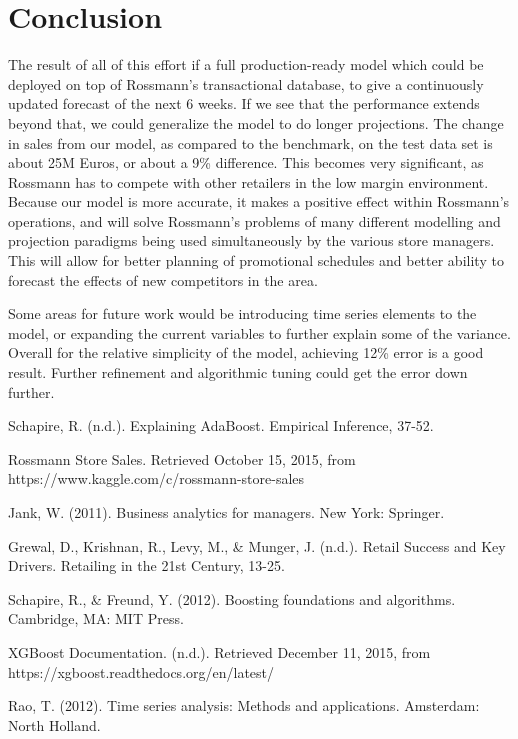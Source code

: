\documentclass[DIV=calc, paper=a4, fontsize=11pt]{scrartcl}	 %
\begin{document}

\section*{Conclusion}

The result of all of this effort if a full production-ready model which could be deployed on top of Rossmann's transactional database, to give a continuously updated forecast of the next 6 weeks. If we see that the performance extends beyond that, we could generalize the model to do longer projections. 
The change in sales from our model, as compared to the benchmark, on the test data set is
about 25M Euros, or about a 9\% difference. This becomes very significant, as Rossmann has to compete 
with other retailers in the low margin environment. Because our model is more accurate, it makes a 
positive effect within Rossmann’s operations, and will solve  Rossmann’s problems of many different 
modelling and projection paradigms being used simultaneously by the various store managers. This will allow for better planning of promotional schedules and better ability to forecast the effects of new competitors in the area.

Some areas for future work would be introducing time series elements to the model, or expanding the current variables to further explain some of the variance. Overall for the relative simplicity of the model, achieving 12\% error is a good result. Further refinement and algorithmic tuning could get the error down further.




\begin{thebibliography}{99} %

Schapire, R. (n.d.). Explaining AdaBoost. Empirical Inference, 37-52. 


Rossmann Store Sales. Retrieved October 15, 2015, from https://www.kaggle.com/c/rossmann-store-sales


Jank, W. (2011). Business analytics for managers. New York: Springer. 


Grewal, D., Krishnan, R., Levy, M., \& Munger, J. (n.d.). Retail Success and Key 
Drivers. Retailing in the 21st Century, 13-25.


 Schapire, R., \& Freund, Y. (2012). Boosting foundations and algorithms. Cambridge, MA: MIT Press. 

 XGBoost Documentation. (n.d.). Retrieved December 11, 2015, from https://xgboost.readthedocs.org/en/latest/  

Rao, T. (2012). Time series analysis: Methods and applications. Amsterdam: North Holland.


\end{thebibliography}
\end{document}
